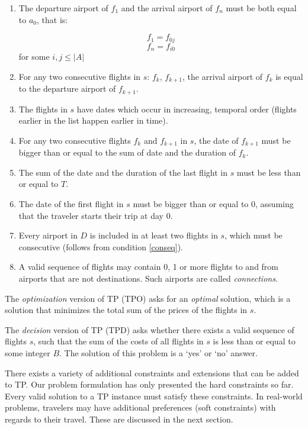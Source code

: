 \documentclass{article}
\theoremstyle{definition}
\begin{document}
\begin{enumerate}
\item The departure airport of $f_{1}$ and the arrival airport of $f_{n}$ must be both equal to $a_{0}$, that is:

$$f_{1}=f_{0j}$$
$$f_{n}=f_{i0}$$
for some $i,j \leq |A|$ 
\item \label{conseq} For any two consecutive flights in $s$: $f_{k}$, $f_{k+1}$, the arrival airport of $f_{k}$ is equal to the departure airport of $f_{k+1}$. 
\item The flights in $s$ have dates which occur in increasing, temporal order (flights earlier in the list happen earlier in time).
\item For any two consecutive flights $f_{k}$ and $f_{k+1}$ in $s$, the date of $f_{k+1}$ must be bigger than or equal to the sum of date and the duration of $f_{k}$.
\item The sum of the date and the duration of the last flight in $s$ must be less than or equal to $T$.
\item The date of the first flight in $s$ must be bigger than or equal to 0, assuming that the traveler starts their trip at day 0.
\item Every airport in $D$ is included in at least two flights in $s$, which must be consecutive (follows from condition \ref{conseq}).
\item A valid sequence of flights may contain 0, 1 or more flights to and from airports that are not destinations. Such airports are called \textit{connections}.
\end{enumerate}

The \textit{optimization} version of TP (TPO) asks for an \textit{optimal} solution, which is a solution that minimizes the total sum of the prices of the flights in $s$.

The \textit{decision} version of TP (TPD) asks whether there exists a valid sequence of flights $s$, such that the sum of the costs of all flights in $s$ is less than or equal to some integer $B$. The solution of this problem is a `yes' or `no' answer.

There exists a variety of additional constraints and extensions that can be added to TP. Our problem formulation has only presented the hard constraints so far. Every valid solution to a TP instance must satisfy these constraints. In real-world problems, travelers may have additional preferences (soft constraints) with regards to their travel. These are discussed in the next section.
\end{document}
